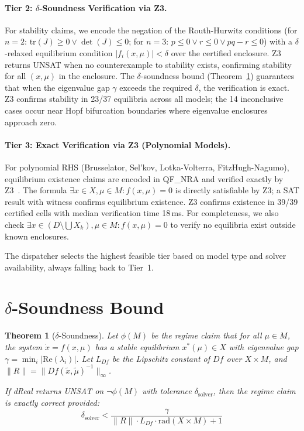 \documentclass[11pt]{article}
\newtheorem{theorem}{Theorem}
\newcommand{\norm}[1]{\|#1\|}
\begin{document}
\paragraph{Tier 2: $\delta$-Soundness Verification via Z3.}
For stability claims, we encode the negation of the Routh-Hurwitz conditions (for $n=2$: $\mathrm{tr}(J) \geq 0 \lor \det(J) \leq 0$; for $n=3$: $p \leq 0 \lor r \leq 0 \lor pq-r \leq 0$) with a $\delta$-relaxed equilibrium condition $|f_i(x,\mu)| < \delta$ over the certified enclosure.
Z3 returns UNSAT when no counterexample to stability exists, confirming stability for all $(x,\mu)$ in the enclosure.
The $\delta$-soundness bound (Theorem~\ref{thm:delta}) guarantees that when the eigenvalue gap $\gamma$ exceeds the required $\delta$, the verification is exact.
Z3 confirms stability in 23/37 equilibria across all models; the 14 inconclusive cases occur near Hopf bifurcation boundaries where eigenvalue enclosures approach zero.

\paragraph{Tier 3: Exact Verification via Z3 (Polynomial Models).}
For polynomial RHS (Brusselator, Sel'kov, Lotka-Volterra, FitzHugh-Nagumo), equilibrium existence claims are encoded in QF\_NRA and verified exactly by Z3~\cite{demoura2008z3}.
The formula $\exists x \in X, \mu \in M : f(x,\mu) = 0$ is directly satisfiable by Z3; a SAT result with witness confirms equilibrium existence.
Z3 confirms existence in 39/39 certified cells with median verification time 18\,ms.
For completeness, we also check $\exists x \in (D \setminus \bigcup X_k), \mu \in M : f(x,\mu) = 0$ to verify no equilibria exist outside known enclosures.

The dispatcher selects the highest feasible tier based on model type and solver availability, always falling back to Tier~1.

\section{$\delta$-Soundness Bound}
\label{sec:delta}

\begin{theorem}[$\delta$-Soundness]
\label{thm:delta}
Let $\phi(M)$ be the regime claim that for all $\mu \in M$, the system $\dot{x} = f(x,\mu)$ has a stable equilibrium $x^*(\mu) \in X$ with eigenvalue gap $\gamma = \min_i |\mathrm{Re}(\lambda_i)|$.
Let $L_{Df}$ be the Lipschitz constant of $Df$ over $X \times M$, and $\norm{R} = \norm{Df(\tilde{x}, \tilde{\mu})^{-1}}_\infty$.

If dReal returns UNSAT on $\neg\phi(M)$ with tolerance $\delta_{\mathrm{solver}}$, then the regime claim is exactly correct provided:
\begin{equation}
\label{eq:delta-bound}
\delta_{\mathrm{solver}} < \frac{\gamma}{\norm{R} \cdot L_{Df} \cdot \mathrm{rad}(X \times M) + 1}
\end{equation}
\end{theorem}
\end{document}
